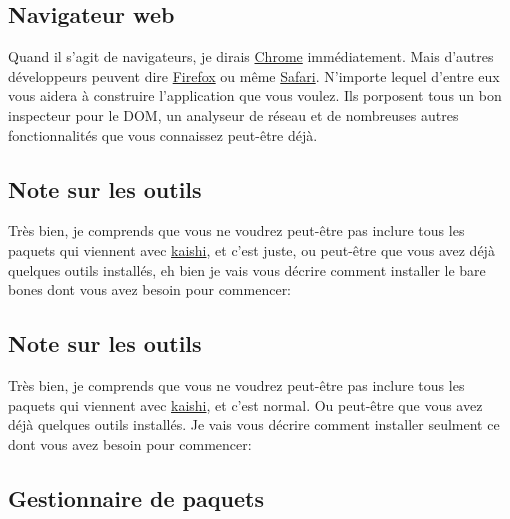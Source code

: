 \documentclass[]{report}
\begin{document}
    \subsection{Navigateur web}

      Quand il s'agit de navigateurs, je dirais \href{https://www.google.com/intl/en/chrome/browser/}{Chrome} immédiatement. Mais d'autres développeurs peuvent dire \href{http://www.mozilla.org/en-US/firefox/new/}{Firefox} ou même \href{https://www.apple.com/safari/}{Safari}. N'importe lequel d'entre eux vous aidera à construire l'application que vous voulez. Ils porposent tous un bon inspecteur pour le DOM, un analyseur de réseau et de nombreuses autres fonctionnalités que vous connaissez peut-être déjà.

    \subsection{Note sur les outils}

      Très bien, je comprends que vous ne voudrez peut-être pas inclure tous les paquets qui viennent avec \href{http://icalialabs.github.io/kaishi/}{kaishi}, et c'est juste, ou peut-être que vous avez déjà quelques outils installés, eh bien je vais vous décrire comment installer le bare bones dont vous avez besoin pour commencer:

    \subsection{Note sur les outils}

      Très bien, je comprends que vous ne voudrez peut-être pas inclure tous les paquets qui viennent avec \href{http://icalialabs.github.io/kaishi/}{kaishi}, et c'est normal. Ou peut-être que vous avez déjà quelques outils installés. Je vais vous décrire comment installer seulment ce dont vous avez besoin pour commencer:

    \subsection{Gestionnaire de paquets}
\end{document}
